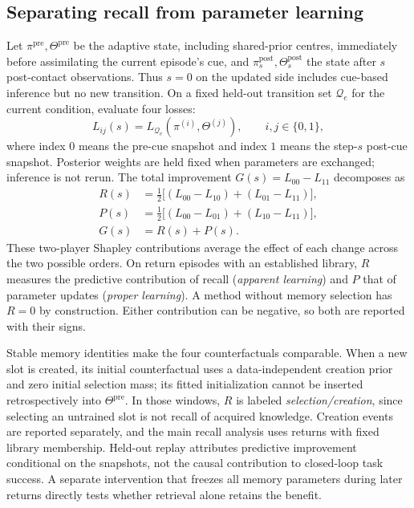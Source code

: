 \subsection{Separating recall from parameter learning}\label{sec:decomposition}
Let $\pi^{\mathrm{pre}},\Theta^{\mathrm{pre}}$ be the adaptive state, including shared-prior centres, immediately before assimilating the current episode's cue, and $\pi^{\mathrm{post}}_s,\Theta^{\mathrm{post}}_s$ the state after $s$ post-contact observations. Thus $s=0$ on the updated side includes cue-based inference but no new transition. On a fixed held-out transition set $\mathcal Q_e$ for the current condition, evaluate four losses:
\begin{equation}
L_{ij}(s)=L_{\mathcal Q_e}(\pi^{(i)},\Theta^{(j)}),
\qquad i,j\in\{0,1\},
\end{equation}
where index $0$ means the pre-cue snapshot and index $1$ means the step-$s$ post-cue snapshot. Posterior weights are held fixed when parameters are exchanged; inference is not rerun. The total improvement $G(s)=L_{00}-L_{11}$ decomposes as
\begin{align}
R(s)&=\tfrac12\big[(L_{00}-L_{10})+(L_{01}-L_{11})\big],\label{eq:recall}\\
P(s)&=\tfrac12\big[(L_{00}-L_{01})+(L_{10}-L_{11})\big],\label{eq:proper}\\
G(s)&=R(s)+P(s).
\end{align}
These two-player Shapley contributions average the effect of each change across the two possible orders. On return episodes with an established library, $R$ measures the predictive contribution of recall (\emph{apparent learning}) and $P$ that of parameter updates (\emph{proper learning}). A method without memory selection has $R=0$ by construction. Either contribution can be negative, so both are reported with their signs.

Stable memory identities make the four counterfactuals comparable. When a new slot is created, its initial counterfactual uses a data-independent creation prior and zero initial selection mass; its fitted initialization cannot be inserted retrospectively into $\Theta^{\mathrm{pre}}$. In those windows, $R$ is labeled \emph{selection/creation}, since selecting an untrained slot is not recall of acquired knowledge. Creation events are reported separately, and the main recall analysis uses returns with fixed library membership. Held-out replay attributes predictive improvement conditional on the snapshots, not the causal contribution to closed-loop task success. A separate intervention that freezes all memory parameters during later returns directly tests whether retrieval alone retains the benefit.
